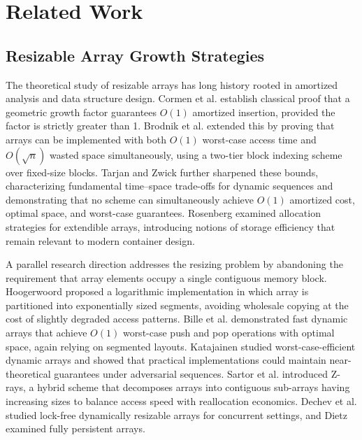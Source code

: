 \documentclass[conference]{IEEEtran}
\begin{document}
\section{Related Work}

\subsection{Resizable Array Growth Strategies}
The theoretical study of resizable arrays has long history rooted in amortized analysis and data structure design. Cormen et al. \cite{cormen_algorithms} establish classical proof that a geometric growth factor guarantees $O(1)$ amortized insertion, provided the factor is strictly greater than 1. Brodnik et al. \cite{optimal_resizable} extended this by proving that arrays can be implemented with both $O(1)$ worst-case access time and $O(\sqrt{n})$ wasted space simultaneously, using a two-tier block indexing scheme over fixed-size blocks. Tarjan and Zwick \cite{time_space_complexity} further sharpened these bounds, characterizing fundamental time--space trade-offs for dynamic sequences and demonstrating that no scheme can simultaneously achieve $O(1)$ amortized cost, optimal space, and worst-case guarantees. Rosenberg \cite{allocating_storage, managing_storage} examined allocation strategies for extendible arrays, introducing notions of storage efficiency that remain relevant to modern container design.

A parallel research direction addresses the resizing problem by abandoning the requirement that array elements occupy a single contiguous memory block. Hoogerwoord \cite{logarithmic_arrays} proposed a logarithmic implementation in which array is partitioned into exponentially sized segments, avoiding wholesale copying at the cost of slightly degraded access patterns. Bille et al. \cite{resizable_optimal_time_space} demonstrated fast dynamic arrays that achieve $O(1)$ worst-case push and pop operations with optimal space, again relying on segmented layouts. Katajainen \cite{fast_array} studied worst-case-efficient dynamic arrays and showed that practical implementations could maintain near-theoretical guarantees under adversarial sequences. Sartor et al. \cite{z_rays} introduced Z-rays, a hybrid scheme that decomposes arrays into contiguous sub-arrays having increasing sizes to balance access speed with reallocation economics. Dechev et al. \cite{lock_free_vector} studied lock-free dynamically resizable arrays for concurrent settings, and Dietz \cite{persistent_arrays} examined fully persistent arrays.
\end{document}
